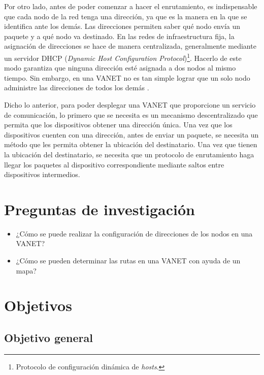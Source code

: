 Por otro lado, antes de poder comenzar a hacer el enrutamiento, es
indispensable que cada nodo de la red tenga una dirección, ya que es la manera
en la que se identifica ante los demás. Las direcciones permiten saber qué nodo
envía un paquete y a qué nodo va destinado. En las redes de infraestructura
fija, la asignación de direcciones se hace de manera centralizada, generalmente
mediante un servidor DHCP (\textit{Dynamic Host Configuration
Protocol})\footnote{Protocolo de configuración dinámica de \textit{hosts}.}.
Hacerlo de este modo garantiza que ninguna dirección esté asignada a dos nodos
al mismo tiempo. Sin embargo, en una VANET no es tan simple lograr que un solo
nodo administre las direcciones de todos los demás \cite{Korichi2018}.

Dicho lo anterior, para poder desplegar una VANET que proporcione un servicio de
comunicación, lo primero que se necesita es un mecanismo descentralizado que
permita que los dispositivos obtener una dirección única. Una vez que los
dispositivos cuenten con una dirección, antes de enviar un paquete, se necesita
un método que les permita obtener la ubicación del destinatario. Una vez que
tienen la ubicación del destinatario, se necesita que un protocolo de
enrutamiento haga llegar los paquetes al dispositivo correspondiente mediante
saltos entre dispositivos intermedios.

\section{Preguntas de investigación}
\label{sec:preguntas_de_investigacion}

\begin{itemize}
  \item ¿Cómo se puede realizar la configuración de direcciones de los nodos en
  una VANET?
  \item ¿Cómo se pueden determinar las rutas en una VANET con ayuda de un mapa?
\end{itemize}

\section{Objetivos}
\label{subsec:objetivos}

\subsection{Objetivo general}
\label{subsec:objetivo_general}

